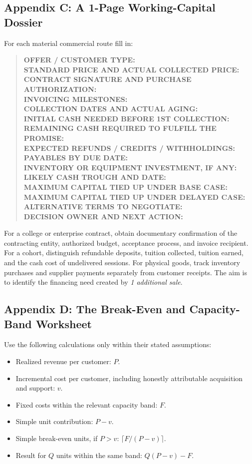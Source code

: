 \subsection*{Appendix C: A 1-Page Working-Capital Dossier}

For each material commercial route fill in:

\begin{quote}
\small
\textbf{OFFER / CUSTOMER TYPE:}\\
\textbf{STANDARD PRICE AND ACTUAL COLLECTED PRICE:}\\
\textbf{CONTRACT SIGNATURE AND PURCHASE AUTHORIZATION:}\\
\textbf{INVOICING MILESTONES:}\\
\textbf{COLLECTION DATES AND ACTUAL AGING:}\\
\textbf{INITIAL CASH NEEDED BEFORE 1ST COLLECTION:}\\
\textbf{REMAINING CASH REQUIRED TO FULFILL THE PROMISE:}\\
\textbf{EXPECTED REFUNDS / CREDITS / WITHHOLDINGS:}\\
\textbf{PAYABLES BY DUE DATE:}\\
\textbf{INVENTORY OR EQUIPMENT INVESTMENT, IF ANY:}\\
\textbf{LIKELY CASH TROUGH AND DATE:}\\
\textbf{MAXIMUM CAPITAL TIED UP UNDER BASE CASE:}\\
\textbf{MAXIMUM CAPITAL TIED UP UNDER DELAYED CASE:}\\
\textbf{ALTERNATIVE TERMS TO NEGOTIATE:}\\
\textbf{DECISION OWNER AND NEXT ACTION:}
\end{quote}

For a college or enterprise contract, obtain documentary confirmation of the contracting entity, authorized budget, acceptance process, and invoice recipient. For a cohort, distinguish refundable deposits, tuition collected, tuition earned, and the cash cost of undelivered sessions. For physical goods, track inventory purchases and supplier payments separately from customer receipts. The aim is to identify the financing need created by \emph{1 additional sale}.

\subsection*{Appendix D: The Break-Even and Capacity-Band Worksheet}

Use the following calculations only within their stated assumptions:
\begin{itemize}
\item Realized revenue per customer: $P$.
\item Incremental cost per customer, including honestly attributable acquisition and support: $v$.
\item Fixed costs within the relevant capacity band: $F$.
\item Simple unit contribution: $P - v$.
\item Simple break-even units, if $P > v$: $\lceil F / (P - v) \rceil$.
\item Result for $Q$ units within the same band: $Q(P - v) - F$.
\end{itemize}

